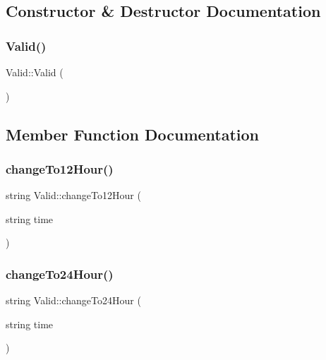 \subsection{Constructor \& Destructor Documentation}
\mbox{\label{class_valid_a0876f57435d6e17ed7c6ffa6c3b5eca3}} 
\subsubsection{\texorpdfstring{Valid()}{Valid()}}
{\footnotesize\ttfamily Valid\+::\+Valid (\begin{DoxyParamCaption}{ }\end{DoxyParamCaption})}



\subsection{Member Function Documentation}
\mbox{\label{class_valid_a13660c1b7d6f13d756d8371f2fd50860}} 
\subsubsection{\texorpdfstring{change\+To12\+Hour()}{changeTo12Hour()}}
{\footnotesize\ttfamily string Valid\+::change\+To12\+Hour (\begin{DoxyParamCaption}\item[{string}]{time }\end{DoxyParamCaption})}

\mbox{\label{class_valid_a6ca76e5fe10bc356a2bef22216ba3403}} 
\subsubsection{\texorpdfstring{change\+To24\+Hour()}{changeTo24Hour()}}
{\footnotesize\ttfamily string Valid\+::change\+To24\+Hour (\begin{DoxyParamCaption}\item[{string}]{time }\end{DoxyParamCaption})}

